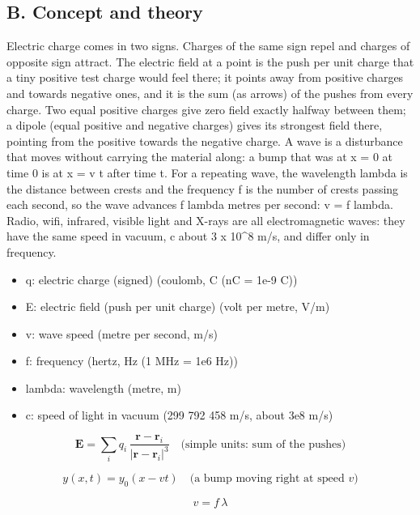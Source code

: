 \documentclass[11pt,a4paper]{article}
\begin{document}
\subsection*{B. Concept and theory}
Electric charge comes in two signs. Charges of the same sign repel and charges of opposite sign attract. The electric field at a point is the push per unit charge that a tiny positive test charge would feel there; it points away from positive charges and towards negative ones, and it is the sum (as arrows) of the pushes from every charge. Two equal positive charges give zero field exactly halfway between them; a dipole (equal positive and negative charges) gives its strongest field there, pointing from the positive towards the negative charge. A wave is a disturbance that moves without carrying the material along: a bump that was at x = 0 at time 0 is at x = v t after time t. For a repeating wave, the wavelength lambda is the distance between crests and the frequency f is the number of crests passing each second, so the wave advances f lambda metres per second: v = f lambda. Radio, wifi, infrared, visible light and X-rays are all electromagnetic waves: they have the same speed in vacuum, c about 3 x 10\textasciicircum{}8 m/s, and differ only in frequency.

\begin{itemize}[nosep]
\item q: electric charge (signed) (coulomb, C (nC = 1e-9 C))
\item E: electric field (push per unit charge) (volt per metre, V/m)
\item v: wave speed (metre per second, m/s)
\item f: frequency (hertz, Hz (1 MHz = 1e6 Hz))
\item lambda: wavelength (metre, m)
\item c: speed of light in vacuum (299 792 458 m/s, about 3e8 m/s)
\end{itemize}

\begin{equation*}
\mathbf E=\sum_i q_i\,\frac{\mathbf r-\mathbf r_i}{|\mathbf r-\mathbf r_i|^{3}}\quad\text{(simple units: sum of the pushes)}
\end{equation*}

\begin{equation*}
y(x,t)=y_0(x-vt)\quad\text{(a bump moving right at speed } v)
\end{equation*}

\begin{equation*}
v=f\,\lambda
\end{equation*}
\end{document}
